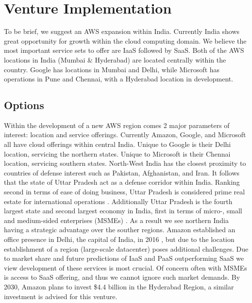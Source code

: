 \documentclass[a4paper, 12pt]{article}
\begin{document}
\section{Venture Implementation}
To be brief, we suggest an AWS expansion within India. 
Currently India shows great opportunity for growth within the cloud computing domain. 
We believe the most important service sets to offer are IaaS followed by SaaS. 
Both of the AWS locations in India (Mumbai \& Hyderabad) are located centrally within the country. 
Google has locations in Mumbai and Delhi, while Microsoft has operations in Pune and Chennai, with a Hyderabad location in development. 

\subsection{Options}
Within the development of a new AWS region comes 2 major parameters of interest: location and service offerings. 
Currently Amazon, Google, and Microsoft all have cloud offerings within central India. 
Unique to Google is their Delhi location, servicing the northern states. 
Unique to Microsoft is their Chennai location, servicing southern states. 
North-West India has the closest proximity to countries of defense interest such as Pakistan, Afghanistan, and Iran. 
It follows that the state of Uttar Pradesh act as a defense corridor within India. 
Ranking second in terms of ease of doing business, Uttar Pradesh is considered prime real estate for international operations \cite[p.~11]{INDIA_UP_TO_NEW_HEIGHTS}. 
Additionally Uttar Pradesh is the fourth largest state and second largest economy in India, first in terms of micro-, small and medium-sided enterprises (MSMEs) \cite[p.~16]{INDIA_DEFENSE_CORRIDOR}. 
As a result we see northern India having a strategic advantage over the souther regions. 
Amazon established an office presence in Delhi, the capital of India, in 2016 \cite{AMZN_AWS_HYDERABAD}, but due to the location establishment of a region (large-scale datacenter) poses additional challenges. 
Due to market share and future predictions of IaaS and PaaS outperforming SaaS we view development of these services is most crucial. 
Of concern often with MSMEs is access to SaaS offering, and thus we cannot ignore such market demands. 
By 2030, Amazon plans to invest \$4.4 billion in the Hyderabad Region, a similar investment is advised for this venture. 
\end{document}
